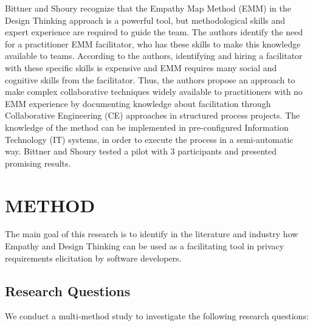 \documentclass[conference]{IEEEtran}
\begin{document}
Bittner and Shoury \cite{DBLP:conf/hicss/BittnerS19} recognize that the Empathy Map Method (EMM) in the Design Thinking approach is a powerful tool, but methodological skills and expert experience are required to guide the team. The authors identify the need for a practitioner EMM facilitator, who has these skills to make this knowledge available to teams. According to the authors, identifying and hiring a facilitator with these specific skills is expensive and EMM requires many social and cognitive skills from the facilitator. Thus, the authors propose an approach to make complex collaborative techniques widely available to practitioners with no EMM experience by documenting knowledge about facilitation through Collaborative Engineering (CE) approaches in structured process projects. The knowledge of the method can be implemented in pre-configured Information Technology (IT) systems, in order to execute the process in a semi-automatic way. Bittner and Shoury \cite{DBLP:conf/hicss/BittnerS19} tested a pilot with 3 participants and presented promising results.

\section{METHOD}
\label{method}


The main goal of this research is to identify in the literature and industry how Empathy and Design Thinking can be used as a facilitating tool in privacy requirements elicitation by software developers.

\subsection{Research Questions}
\label{rq}  

We conduct a multi-method study \cite{DBLP:books/sp/08/EasterbrookSSD08} to investigate the following research questions:
\end{document}
